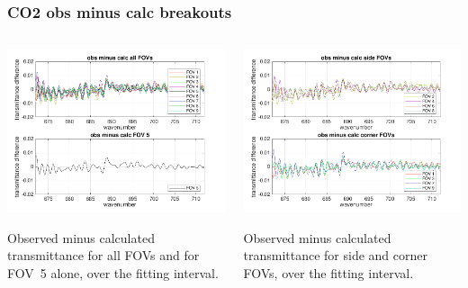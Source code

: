 \documentclass[10pt]{beamer}
\begin{document}
\begin{frame}
\frametitle{CO2 obs minus calc breakouts}
\begin{columns}[t]
\begin{column}{0.5\textwidth}
  \begin{centering}
  \includegraphics[width=\textwidth]{figures/CO2_breakout_1.png}
  \end{centering}\vspace{3mm}

Observed minus calculated transmittance for all FOVs and for FOV~5
alone, over the fitting interval.

\end{column}
\begin{column}{0.5\textwidth}  
  \begin{centering}
  \includegraphics[width=\textwidth]{figures/CO2_breakout_2.png}
  \end{centering}\vspace{3mm}

Observed minus calculated transmittance for side and corner FOVs,
over the fitting interval.

\end{column}
\end{columns}
\end{frame}
\end{document}
